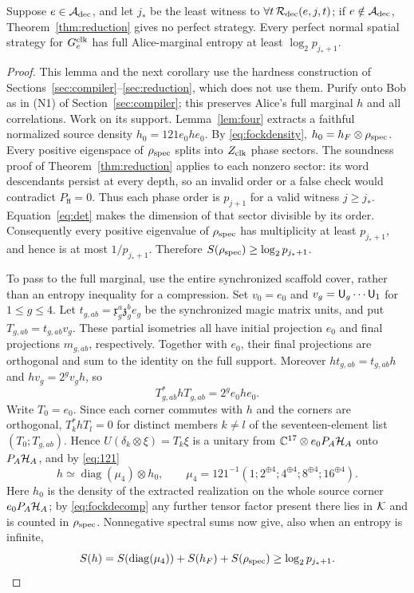 \begin{lemma}\label{lem:clockentropy}
Suppose $e\in\mathcal A_{\rm dec}$, and let $j_*$ be the least witness to $\forall t\,\mathcal R_{\rm dec}(e,j,t)$; if $e\notin\mathcal A_{\rm dec}$, Theorem~\ref{thm:reduction} gives no perfect strategy.
Every perfect normal spatial strategy for $G^{\rm clk}_e$ has full
Alice-marginal entropy at least $\log_2 p_{j_*+1}$.
\end{lemma}
\begin{proof}
This lemma and the next corollary use the hardness construction of
Sections~\ref{sec:compiler}--\ref{sec:reduction}, which does not use them.
Purify onto Bob as in (N1) of Section~\ref{sec:compiler}; this preserves
Alice's full marginal $h$ and all correlations. Work on its support.
Lemma~\ref{lem:four} extracts a faithful normalized source density
$h_0=121e_0he_0$. By \eqref{eq:fockdensity},
$h_0=h_F\otimes\rho_{\rm spec}$. Every positive eigenspace of
$\rho_{\rm spec}$ splits into $Z_{\rm clk}$ phase sectors. The soundness
proof of Theorem~\ref{thm:reduction} applies to each nonzero sector:
its word descendants persist at every depth, so an invalid order or a
false check would contradict $P_{\mathtt H}=0$. Thus each phase order
is $p_{j+1}$ for a valid witness $j\ge j_*$. Equation~\eqref{eq:det}
makes the dimension of that sector divisible by its order. Consequently
every positive eigenvalue of $\rho_{\rm spec}$ has multiplicity at least
$p_{j_*+1}$, and hence is at most $1/p_{j_*+1}$. Therefore
$S(\rho_{\rm spec})\ge\log_2p_{j_*+1}$.

To pass to the full marginal, use the entire synchronized scaffold
cover, rather than an entropy inequality for a compression. Set
$v_0=e_0$ and $v_g={\mathsf U}_g\cdots {\mathsf U}_1$ for $1\le g\le4$.
Let $t_{g,ab}=\mathfrak x_g^a\mathfrak z_g^b e_g$ be the synchronized
magic matrix units, and put $T_{g,ab}=t_{g,ab}v_g$. These partial
isometries all have initial projection $e_0$ and final projections
$m_{g,ab}$, respectively. Together with $e_0$, their final projections
are orthogonal and sum to the identity on the full support. Moreover
$ht_{g,ab}=t_{g,ab}h$ and $hv_g=2^gv_gh$, so
\[
 T_{g,ab}^*hT_{g,ab}=2^g e_0he_0.
\]
Write $T_0=e_0$. Since each corner commutes with $h$ and the corners
are orthogonal, $T_k^*hT_l=0$ for distinct members $k\ne l$ of the
seventeen-element list $(T_0;T_{g,ab})$. Hence
$U(\delta_k\otimes\xi)=T_k\xi$ is a unitary from
$\mathbb C^{17}\otimes e_0P_A\mathcal H_A$ onto $P_A\mathcal H_A$, and by \eqref{eq:121}
\[
 h\simeq\operatorname{diag}(\mu_4)\otimes h_0,
 \qquad \mu_4=121^{-1}(1;2^{\oplus4};4^{\oplus4};8^{\oplus4};16^{\oplus4}).
\]
Here $h_0$ is the density of the extracted realization on the whole source
corner $e_0P_A\mathcal H_A$; by \eqref{eq:fockdecomp} any further tensor factor
present there lies in $\mathcal K$ and is counted in $\rho_{\rm spec}$. Nonnegative spectral sums now give,
also when an entropy is infinite,
\[
 S(h)=S(\operatorname{diag}(\mu_4))+S(h_F)+S(\rho_{\rm spec})
 \ge\log_2p_{j_*+1}.
\]
\end{proof}

